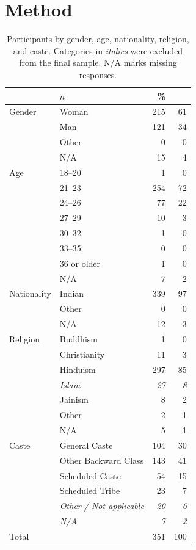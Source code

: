 \documentclass[12pt, a4paper]{article}
\begin{document}
\section{Method}

\begin{table}    
\caption[Participants by gender, age, nationality, religion, and caste]{Participants by gender, age, nationality, religion, and caste. Categories in \textit{italics} were excluded from the final sample. N/A marks missing responses.}
\centering
{}
\small	
\begin{tabular}{llrr} \addlinespace \toprule
\multicolumn{2}{l}{Category} & $n$ & \% \\ \midrule \addlinespace 
Gender      & Woman      & 215 & 61 \\
            & Man & 121 & 34 \\
            & Other & 0 & 0 \\
            & N/A & 15 & 4 \\ \addlinespace \addlinespace
Age         & 18--20 & 1 & 0 \\
            & 21--23 & 254 & 72 \\
            & 24--26 &  77 & 22 \\
            & 27--29 &  10 &  3 \\
            & 30--32 &   1 &  0 \\
            & 33--35 &   0 &  0 \\
            & 36 or older & 1 & 0 \\ 
            & N/A & 7 & 2 \\ \addlinespace \addlinespace
Nationality & Indian & 339 & 97 \\
            & Other & 0 & 0 \\
            & N/A & 12 & 3 \\ \addlinespace \addlinespace
Religion    & Buddhism & 1 & 0 \\ 
            & Christianity & 11 & 3 \\ 
            & Hinduism & 297 & 85 \\ 
            & \textit{Islam} & \textit{27} & \textit{8} \\ 
            & Jainism & 8 & 2 \\ 
            & Other & 2 & 1 \\ 
            & N/A & 5 & 1 \\ \addlinespace \addlinespace
Caste       & General Caste & 104 & 30 \\ 
            & Other Backward Class & 143 & 41 \\ 
            & Scheduled Caste & 54 & 15 \\ 
            & Scheduled Tribe & 23 & 7 \\ 
            & \textit{Other / Not applicable} & \textit{20} & \textit{6} \\ 
            & \textit{N/A} & \textit{7} & \textit{2} \\ \addlinespace \midrule
Total       &   & 351 & 100 \\ \bottomrule
\end{tabular}
\label{tab:t1}
\end{table}
\end{document}
